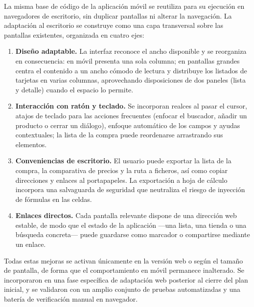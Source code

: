 La misma base de c\'odigo de la aplicaci\'on m\'ovil se reutiliza para su ejecuci\'on en navegadores
de escritorio, sin duplicar pantallas ni alterar la navegaci\'on. La adaptaci\'on al escritorio se
construye como una capa transversal sobre las pantallas existentes, organizada en cuatro ejes:

\begin{enumerate}
  \item \textbf{Dise\~no adaptable.} La interfaz reconoce el ancho disponible y se reorganiza en
    consecuencia: en m\'ovil presenta una sola columna; en pantallas grandes centra el contenido a
    un ancho c\'omodo de lectura y distribuye los listados de tarjetas en varias columnas,
    aprovechando disposiciones de dos paneles (lista y detalle) cuando el espacio lo permite.
  \item \textbf{Interacci\'on con rat\'on y teclado.} Se incorporan realces al pasar el cursor,
    atajos de teclado para las acciones frecuentes (enfocar el buscador, a\~nadir un producto o
    cerrar un di\'alogo), enfoque autom\'atico de los campos y ayudas contextuales; la lista de la
    compra puede reordenarse arrastrando sus elementos.
  \item \textbf{Conveniencias de escritorio.} El usuario puede exportar la lista de la compra, la
    comparativa de precios y la ruta a ficheros, as\'i como copiar direcciones y enlaces al
    portapapeles. La exportaci\'on a hoja de c\'alculo incorpora una salvaguarda de seguridad que
    neutraliza el riesgo de inyecci\'on de f\'ormulas en las celdas.
  \item \textbf{Enlaces directos.} Cada pantalla relevante dispone de una direcci\'on web estable,
    de modo que el estado de la aplicaci\'on ---una lista, una tienda o una b\'usqueda concreta---
    puede guardarse como marcador o compartirse mediante un enlace.
\end{enumerate}

Todas estas mejoras se activan \'unicamente en la versi\'on web o seg\'un el tama\~no de pantalla,
de forma que el comportamiento en m\'ovil permanece inalterado. Se incorporaron en una fase
espec\'ifica de adaptaci\'on web posterior al cierre del plan inicial, y se validaron con un amplio
conjunto de pruebas automatizadas y una bater\'ia de verificaci\'on manual en navegador.
